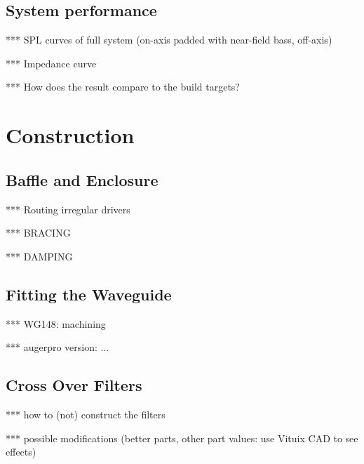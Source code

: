 \documentclass[12pt,a4paper]{article}
\begin{document}
\subsection{System performance}

*** SPL curves of full system (on-axis padded with near-field bass, off-axis)

*** Impedance curve

*** How does the result compare to the build targets?


\section{Construction}

\subsection{Baffle and Enclosure}

*** Routing irregular drivers\cite{reddit_flushmount}

*** BRACING

*** DAMPING


\subsection{Fitting the Waveguide}

*** WG148: machining

*** augerpro version: ...


\subsection{Cross Over Filters}

*** how to (not) construct the filters

*** possible modifications (better parts, other part values: use Vituix CAD to see effects)




\end{document}

